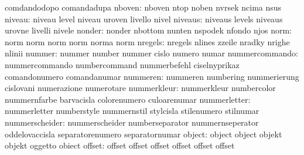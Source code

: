                            comdandodopo              comandadupa
                   nboven: nboven                    ntop
                           noben                     nvrsek
                           ncima                     nsus
                   niveau: niveau                    level
                           niveau                    uroven
                           livello                   nivel
                  niveaus: niveaus                   levels
                           niveaus                   urovne
                           livelli                   nivele
                   nonder: nonder                    nbottom
                           nunten                    nspodek
                           nfondo                    njos
                     norm: norm                      norm
                           norm                      norm
                           norma                     norm
                  nregels: nregels                   nlines
                           zzeile                    nradky
                           nrighe                    nlinii
                   nummer: nummer                    number
                           nummer                    cislo
                           numero                    numar
           nummercommando: nummercommando            numbercommand
                           nummerbefehl              ciselnyprikaz
                           comandonumero             comandanumar
                 nummeren: nummeren                  numbering
                           nummerierung              cislovani
                           numerazione               numerotare
              nummerkleur: nummerkleur               numbercolor
                           nummernfarbe              barvacisla
                           colorenumero              culoarenumar
             nummerletter: nummerletter              numberstyle
                           nummernstil               stylcisla
                           stilenumero               stilnumar
           nummerscheider: nummerscheider            numberseparator
                           nummernseperator          oddelovaccisla
                           separatorenumero          separatornumar
                   object: object                    object
                           objekt                    objekt
                           oggetto                   obiect
                   offset: offset                    offset
                           offset                    offset
                           offset                    offset

